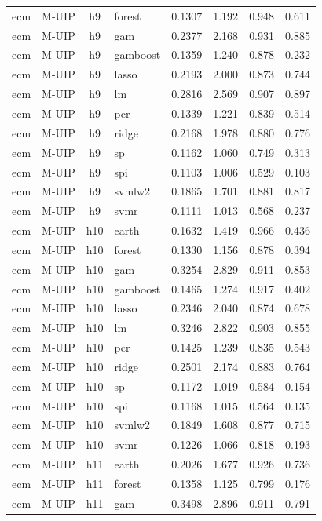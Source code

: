 \begin{ThreePartTable}
\begin{longtable}[t]{llclcccc}
ecm & M-UIP & h9 & forest & 0.1307 & 1.192 & 0.948 & 0.611\\
ecm & M-UIP & h9 & gam & 0.2377 & 2.168 & 0.931 & 0.885\\
ecm & M-UIP & h9 & gamboost & 0.1359 & 1.240 & 0.878 & 0.232\\
ecm & M-UIP & h9 & lasso & 0.2193 & 2.000 & 0.873 & 0.744\\
ecm & M-UIP & h9 & lm & 0.2816 & 2.569 & 0.907 & 0.897\\
ecm & M-UIP & h9 & pcr & 0.1339 & 1.221 & 0.839 & 0.514\\
ecm & M-UIP & h9 & ridge & 0.2168 & 1.978 & 0.880 & 0.776\\
ecm & M-UIP & h9 & sp & 0.1162 & 1.060 & 0.749 & 0.313\\
ecm & M-UIP & h9 & spi & 0.1103 & 1.006 & 0.529 & 0.103\\
ecm & M-UIP & h9 & svmlw2 & 0.1865 & 1.701 & 0.881 & 0.817\\
ecm & M-UIP & h9 & svmr & 0.1111 & 1.013 & 0.568 & 0.237\\
\addlinespace
ecm & M-UIP & h10 & earth & 0.1632 & 1.419 & 0.966 & 0.436\\
ecm & M-UIP & h10 & forest & 0.1330 & 1.156 & 0.878 & 0.394\\
ecm & M-UIP & h10 & gam & 0.3254 & 2.829 & 0.911 & 0.853\\
ecm & M-UIP & h10 & gamboost & 0.1465 & 1.274 & 0.917 & 0.402\\
ecm & M-UIP & h10 & lasso & 0.2346 & 2.040 & 0.874 & 0.678\\
ecm & M-UIP & h10 & lm & 0.3246 & 2.822 & 0.903 & 0.855\\
ecm & M-UIP & h10 & pcr & 0.1425 & 1.239 & 0.835 & 0.543\\
ecm & M-UIP & h10 & ridge & 0.2501 & 2.174 & 0.883 & 0.764\\
ecm & M-UIP & h10 & sp & 0.1172 & 1.019 & 0.584 & 0.154\\
ecm & M-UIP & h10 & spi & 0.1168 & 1.015 & 0.564 & 0.135\\
ecm & M-UIP & h10 & svmlw2 & 0.1849 & 1.608 & 0.877 & 0.715\\
ecm & M-UIP & h10 & svmr & 0.1226 & 1.066 & 0.818 & 0.193\\
\addlinespace
ecm & M-UIP & h11 & earth & 0.2026 & 1.677 & 0.926 & 0.736\\
ecm & M-UIP & h11 & forest & 0.1358 & 1.125 & 0.799 & 0.176\\
ecm & M-UIP & h11 & gam & 0.3498 & 2.896 & 0.911 & 0.791\\

\end{longtable}
\end{ThreePartTable}
